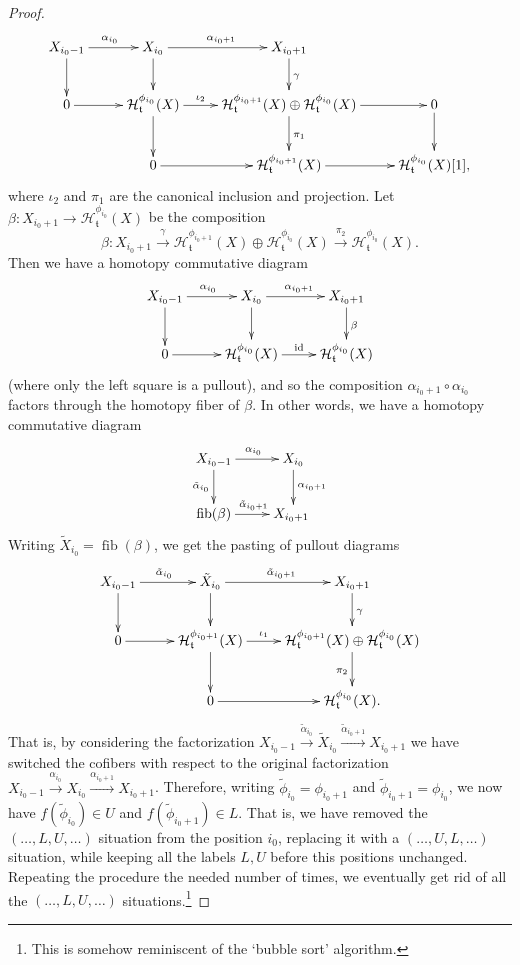 \documentclass{article}
\theoremstyle{definition}
\newcommand{\tee}{\mathfrak{t}}
\DeclareMathOperator{\fib}{fib}
\begin{document}
\begin{proof}
\[
\xymatrix{X_{i_0-1}\ar[r]^{\alpha_{i_0}}\ar[d] & X_{i_0}\ar[r]^{\alpha_{i_0+1}}\ar[d] & X_{i_0+1}\ar[d]^{\gamma}\\
0\ar[r]&\mathcal{H}^{\phi_{i_0}}_{\tee}(X)\ar[d]\ar[r]^-{\iota_2}&\mathcal{H}^{\phi_{i_0+1}}_{\tee}(X)\oplus \mathcal{H}^{\phi_{i_0}}_{\tee}(X)\ar[d]^{\pi_1}\ar[r] &0\ar[d]\\
&0\ar[r]&\mathcal{H}^{\phi_{i_0+1}}_{\tee}(X)\ar[r]&\mathcal{H}^{\phi_{i_0}}_{\tee}(X)[1],
}
\]
where $\iota_2$ and $\pi_1$ are the canonical inclusion and projection. Let $\beta\colon X_{i_0+1}\to \mathcal{H}^{\phi_{i_0}}_{\tee}(X)$ be the composition
\[
\beta\colon X_{i_0+1}\xrightarrow{\gamma} \mathcal{H}^{\phi_{i_0+1}}_{\tee}(X)\oplus \mathcal{H}^{\phi_{i_0}}_{\tee}(X)\xrightarrow{\pi_2} 
\mathcal{H}^{\phi_{i_0}}_{\tee}(X).
\]
Then we have a homotopy commutative diagram
\[
\xymatrix{
X_{i_0-1}\ar[r]^{\alpha_{i_0}}\ar[d]&X_{i_0}\ar[r]^{\alpha_{i_0+1}}\ar[d] & X_{i_0+1}\ar[d]^{\beta}\\
0\ar[r]&\mathcal{H}^{\phi_{i_0}}_{\tee}(X)\ar[r]^-{\mathrm{id}}&\mathcal{H}^{\phi_{i_0}}_{\tee}(X)
}
\]
(where only the left square is a pullout), and so the composition $\alpha_{i_0+1}\circ \alpha_{i_0}$ factors through the homotopy fiber of $\beta$. In other words, we have a homotopy commutative diagram
\[
\xymatrix{
X_{i_0-1}\ar[r]^{\alpha_{i_0}}\ar[d]_{\tilde{\alpha}_{i_0}}&X_{i_0}\ar[d]^{\alpha_{i_0+1}}\\
\fib(\beta)\ar[r]^{\tilde{\alpha}_{i_0+1}}&X_{i_0+1}\
}
\]
Writing $\tilde{X}_{i_0}=\fib(\beta)$, we get the pasting of pullout diagrams
\[
\xymatrix{X_{i_0-1}\ar[r]^{\tilde{\alpha}_{i_0}}\ar[d] & \tilde{X}_{i_0}\ar[r]^{\tilde{\alpha}_{i_0+1}}\ar[d] & X_{i_0+1}\ar[d]^{\gamma}\\
0\ar[r]&\mathcal{H}^{\phi_{i_0+1}}_{\tee}(X)\ar[d]\ar[r]^-{\iota_1}&\mathcal{H}^{\phi_{i_0+1}}_{\tee}(X)\oplus \mathcal{H}^{\phi_{i_0}}_{\tee}(X)\ar[d]_{\pi_2}\\
&0\ar[r]&\mathcal{H}^{\phi_{i_0}}_{\tee}(X).
}
\]
That is, by considering the factorization $X_{i_0-1}\xrightarrow{\tilde{\alpha}_{i_0}} \tilde{X}_{i_0}\xrightarrow{\tilde{\alpha}_{i_0+1}} X_{i_0+1}$ we have switched the cofibers with respect to the original factorization $X_{i_0-1}\xrightarrow{{\alpha}_{i_0}} {X}_{i_0}\xrightarrow{{\alpha}_{i_0+1}} X_{i_0+1}$. Therefore, writing $\tilde{\phi}_{i_0}=\phi_{i_0+1}$ and $\tilde{\phi}_{i_0+1}=\phi_{i_0}$, 
we now have  $f(\tilde{\phi}_{i_0})\in U$ and $f(\tilde{\phi}_{i_0+1})\in L$. That is, we have removed the $(\dots,L,U,\dots)$ situation from the position $i_0$, replacing it with a $(\dots,U,L,\dots)$ situation, while keeping all the labels $L,U$ before this positions unchanged. Repeating the procedure the needed number of times, we eventually get rid of all the $(\dots,L,U,\dots)$ situations.\footnote{This is somehow reminiscent of the `bubble sort' algorithm.}
\end{proof}
\end{document}
